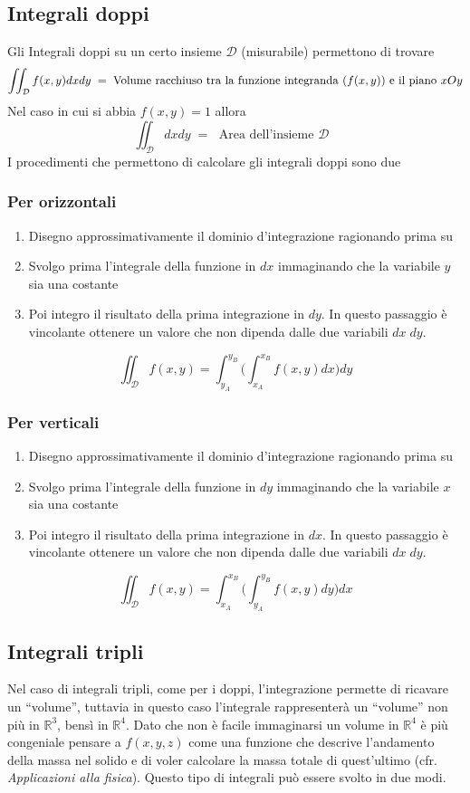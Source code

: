 \documentclass[10pt,a4paper]{report}
\newcommand{\erre}[1]{$\mathbb{R}^{#1}$}
\begin{document}
		\subsection*{Integrali doppi}
			Gli Integrali doppi su un certo insieme $ \mathcal{D} $ (misurabile) permettono di trovare
			\[ \iint_{\mathcal{D}} f(x,y)dxdy \; = \; \text{Volume racchiuso tra la funzione integranda ($ f(x,y) $) e il piano $ xOy $} \]
			Nel caso in cui si abbia $ f(x,y) = 1 $ allora 
			\[ \iint_{\mathcal{D}} dxdy \; = \; \text{ Area dell'insieme $\mathcal{D}$  }\]
			I procedimenti che permettono di calcolare gli integrali doppi sono due
				\subsubsection{Per orizzontali}
				\begin{enumerate}
					\item Disegno approssimativamente il dominio d'integrazione ragionando prima su
					\item Svolgo prima l'integrale della funzione in $ dx $ immaginando che la variabile $ y $ sia una costante
					\item Poi integro il risultato della prima integrazione in $ dy $. In questo passaggio è vincolante ottenere un valore che non dipenda dalle due variabili $ dx \; dy $.
				\end{enumerate}
				\[ \iint_{\mathcal{D}} f(x,y) = \int_{y_{A}}^{y_{B}} \Big(\int_{x_{A}}^{x_{B}}f(x,y) dx\Big) dy \]
				\subsubsection{Per verticali}
				\begin{enumerate}
					\item Disegno approssimativamente il dominio d'integrazione ragionando prima su
					\item Svolgo prima l'integrale della funzione in $ dy $ immaginando che la variabile $ x $ sia una costante
					\item Poi integro il risultato della prima integrazione in $ dx $. In questo passaggio è vincolante ottenere un valore che non dipenda dalle due variabili $ dx \; dy $.
				\end{enumerate}
				\[ \iint_{\mathcal{D}} f(x,y) = \int_{x_{A}}^{x_{B}} \Big(\int_{y_{A}}^{y_{B}}f(x,y) dy\Big) dx \]
				
		\subsection*{Integrali tripli}
		Nel caso di integrali tripli, come per i doppi, l'integrazione permette di ricavare un ``volume'', tuttavia in questo caso l'integrale rappresenterà un ``volume'' non più in \erre{3}, bensì in \erre{4}. Dato che non è facile immaginarsi un volume in $\mathbb{R}^{4}$ è più congeniale pensare a $f(x,y,z)$ come una funzione che descrive l'andamento della massa nel solido e di voler calcolare la massa totale di quest'ultimo (cfr. \textit{Applicazioni alla fisica}).
		Questo tipo di integrali può essere svolto in due modi.
\end{document}
